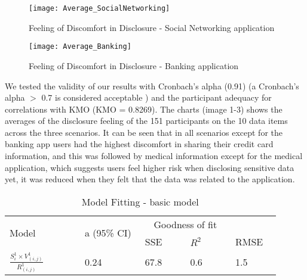 \documentclass[10pt]{article}
\begin{document}
\begin{figure}[h]
\begin{center}
\texttt{[image: Average\_SocialNetworking]}
\caption{Feeling of Discomfort in Disclosure - Social Networking application}
\end{center}
\end{figure}

\begin{figure}[h]
\begin{center}
\texttt{[image: Average\_Banking]}
\caption{Feeling of Discomfort in Disclosure - Banking application}
\end{center}
\end{figure}

We tested the validity of our results with Cronbach's alpha (0.91) (a Cronbach's alpha $>$ 0.7 is considered acceptable \cite {nunnally1967psychometric}) and the participant adequacy for correlations with KMO (KMO =  0.8269). The charts (image 1-3) shows the averages of the disclosure feeling of the 151 participants on the 10 data items across the three scenarios. It can be seen that in all scenarios except for the banking app users had the highest discomfort in sharing their credit card information, and this was followed by medical information except for the medical application, which suggests users feel higher risk when disclosing sensitive data yet, it was reduced when they felt that the data was related to the application.

\begin{center}
\begin{table}[H]
\caption{Model Fitting - basic model}
\begin{center}
\begin{adjustbox}{width=0.5\textwidth} 
\begin{tabular}{|p{0.25\linewidth}|p{0.2\linewidth}|p{0.15\linewidth}|p{0.15\linewidth}|p{0.15\linewidth}|} 
\hline
\multirow{2}{*}{Model}&\multirow{2}{*}{a (95\% CI)}& \multicolumn{2}{c}{Goodness of fit} &\\   \cline{3-5}
& & SSE& $R^2$& RMSE\\
\hline
$\frac{S_{i}^1 \times V_{(i,j)}^1}{R_{(i,j)}^1}$  & 0.24 &67.8 & 0.6 & 1.5 \\
\hline
\end{tabular}
\end{adjustbox}
\end{center}
\end{table}
\end{center} 
\end{document}
